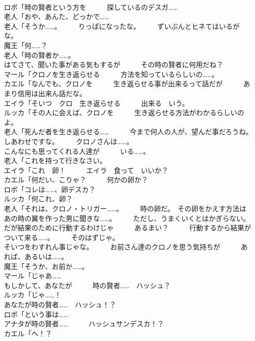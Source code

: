 \documentclass[8pt]{extreport}
\begin{document}
\begin{CJK}{UTF8}{min}
\\	ロボ「時の賢者という方を　　　探しているのデスガ……	
\\	老人「おや、あんた、どっかで……	
\\	老人「そうか……。　　　りっぱになったな。　　　ずいぶんとヒネてはいるがな。	
\\	魔王「何……？	
\\	老人「時の賢者か……。	
\\	はてさて、聞いた事がある気もするが　　　その時の賢者に何用だね？	
\\	マール「クロノを生き返らせる　　　方法を知っているらしいの……。	
\\	カエル「なんでも、クロノを　　　生き返らせる事が出来るって話だが　　　あまり信用は出来ん話だな。	
\\	エイラ「そいつ　クロ　生き返らせる　　　出来る　いう。	
\\	ルッカ「その人に会えば、クロノを　　　生き返らせる方法がわかるらしいのよ。	
\\	老人「死んだ者を生き返らせる……　　　今まで何人の人が、望んだ事だろうね。　　　しあわせですな。　　　クロノさんは……。	
\\	こんなにも思ってくれる人達が　　　いる……。	
\\	老人「これを持って行きなさい。	
\\	エイラ「これ　卵！　　　エイラ　食って　いいか？	
\\	カエル「何だい、こりゃ？　　　何かの卵か？	
\\	ロボ「コレは……、卵デスカ？	
\\	ルッカ「何これ、卵？	
\\	老人「それは、クロノ・トリガー……。　　　時の卵だ。　その卵をかえす方法は　　　あの時の翼を作った男に聞きな……。　　　ただし、うまくいくとはかぎらない。　　　だが結果のために行動するわけじゃ　　　あるまい？　　　行動するから結果がついて来る……。　　　そのはずじゃ。	
\\	そいつをわすれん事じゃな。　　　お前さん達のクロノを思う気持ちが　　　あれば、あるいは……。	
\\	魔王「そうか、お前か……。	
\\	マール「じゃあ……	
\\	もしかして、あなたが　　　時の賢者……　ハッシュ？	
\\	ルッカ「じゃ……！	
\\	あなたが時の賢者……　ハッシュ！？	
\\	ロボ「という事は……	
\\	アナタが時の賢者……　　　ハッシュサンデスカ！？	
\\	カエル「ヘ！？	

\end{CJK}
\end{document}

